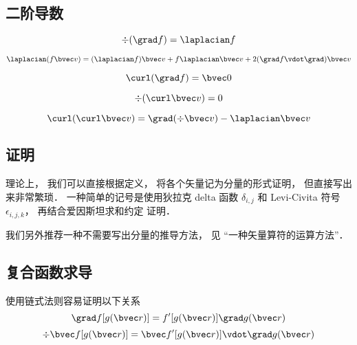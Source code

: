 \subsection{二阶导数}

\begin{equation}
\div (\grad f) = \laplacian f
\end{equation}

\begin{equation}\label{VopEq_eq5}
\laplacian (f \bvec v) = (\laplacian f)\bvec v + f \laplacian \bvec v + 2 (\grad f \vdot \grad) \bvec v
\end{equation}

\begin{equation}
\curl (\grad f) = \bvec 0
\end{equation}

\begin{equation}
\div (\curl \bvec v) = 0
\end{equation}

\begin{equation}
\curl(\curl \bvec v) = \grad(\div\bvec v) - \laplacian \bvec v
\end{equation}

\subsection{证明}
理论上， 我们可以直接根据定义， 将各个矢量记为分量的形式证明， 但直接写出来非常繁琐． 一种简单的记号是使用狄拉克 delta 函数 $\delta_{i,j}$ 和 Levi-Civita 符号 $\epsilon_{i,j,k}$， 再结合爱因斯坦求和约定%
证明．

我们另外推荐一种不需要写出分量的推导方法， 见 “一种矢量算符的运算方法”．

\subsection{复合函数求导}
使用链式法则容易证明以下关系
\begin{equation}
\grad f[g(\bvec r)] = f'[g(\bvec r)] \grad g(\bvec r)
\end{equation}
\begin{equation}
\div \bvec f[g(\bvec r)] = \bvec f'[g(\bvec r)] \vdot \grad g(\bvec r)
\end{equation}
